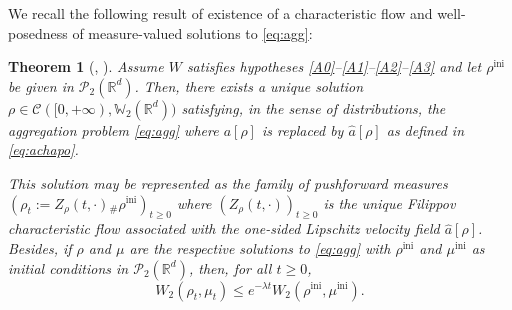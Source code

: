 \documentclass[11pt]{article}
\numberwithin{equation}{section}
\newcommand{\ini}{\mathrm{ini}}
\def\RR{\mathbb{R}}
\def\WW{\mathbb{W}}
\def\calC{{\mathcal C}}
\def\calP{{\mathcal P}}
\def\achapo{\widehat{a}}
\theoremstyle{plain}
\newtheorem{theorem}{Theorem}[section]
\theoremstyle{definition}
\begin{document}
We recall the following result of existence of a characteristic flow and well-posedness of measure-valued solutions to \eqref{eq:agg}:
\begin{theorem}[{\cite[Th.\,2.12 \& 2.13]{figalli11}, \cite[Th.\,2.5 \& 2.9]{cjlv15}}]\label{thm:cjlv15}
Assume $W$ satisfies hypotheses \eqref{A0}--\eqref{A1}--\eqref{A2}--\eqref{A3} and let $\rho^{\ini}$ be given in $\calP_2(\RR^d)$.
Then, there exists a unique solution $\rho \in \calC([0,+\infty), \WW _2(\RR^d))$
satisfying, in the sense of distributions, the aggregation problem \eqref{eq:agg} where $a[\rho]$ is replaced by $\achapo[\rho]$ as defined in \eqref{eq:achapo}.

This solution may be represented as the family of pushforward measures
$(\rho_t:=Z_{\rho}(t,\cdot){}_\# \rho^{\ini})_{t \geq 0}$
where $(Z_{\rho}(t,\cdot))_{t \geq 0}$ is the unique Filippov characteristic flow associated with the one-sided Lipschitz velocity
field $\achapo[\rho]$.
Besides, if $\rho$ and $\mu$
are the respective solutions to \eqref{eq:agg}
with $\rho^{\ini}$ and $\mu^{\ini}$ as initial conditions in ${\mathcal P}_{2}(\RR^d)$,
then, for all $t \geq 0$,
\begin{equation}\label{ineq:contractionLambdaCvx:cjlv5}
W_2(\rho_t,\mu_t) \leq e^{- \lambda t}
W_2(\rho^{\ini},\mu^{\ini}).
\end{equation}
\end{theorem}
\end{document}

